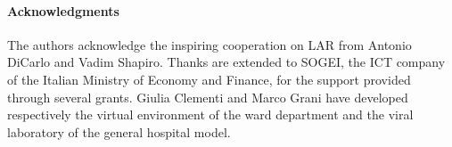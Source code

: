 \paragraph*{Acknowledgments}

The authors acknowledge the inspiring cooperation on LAR from Antonio DiCarlo and Vadim Shapiro. Thanks are extended to SOGEI, the ICT company of the Italian Ministry of Economy and Finance, for the support provided through several grants. Giulia Clementi and Marco Grani have developed respectively the virtual environment of the ward department and the viral laboratory  of the general hospital model.
